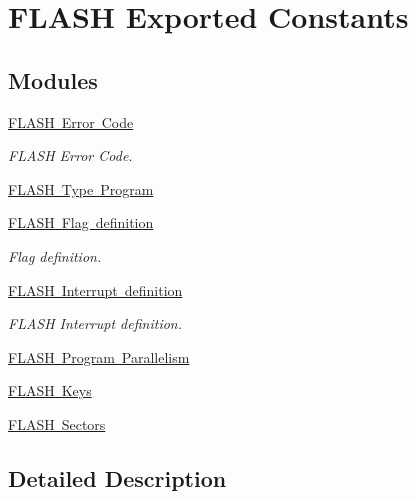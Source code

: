 \hypertarget{group___f_l_a_s_h___exported___constants}{}\section{F\+L\+A\+SH Exported Constants}
\label{group___f_l_a_s_h___exported___constants}
\subsection*{Modules}
\begin{DoxyCompactItemize}
\item 
\mbox{\hyperlink{group___f_l_a_s_h___error___code}{F\+L\+A\+S\+H Error Code}}
\begin{DoxyCompactList}\small\item\em F\+L\+A\+SH Error Code. \end{DoxyCompactList}\item 
\mbox{\hyperlink{group___f_l_a_s_h___type___program}{F\+L\+A\+S\+H Type Program}}
\item 
\mbox{\hyperlink{group___f_l_a_s_h___flag__definition}{F\+L\+A\+S\+H Flag definition}}
\begin{DoxyCompactList}\small\item\em Flag definition. \end{DoxyCompactList}\item 
\mbox{\hyperlink{group___f_l_a_s_h___interrupt__definition}{F\+L\+A\+S\+H Interrupt definition}}
\begin{DoxyCompactList}\small\item\em F\+L\+A\+SH Interrupt definition. \end{DoxyCompactList}\item 
\mbox{\hyperlink{group___f_l_a_s_h___program___parallelism}{F\+L\+A\+S\+H Program Parallelism}}
\item 
\mbox{\hyperlink{group___f_l_a_s_h___keys}{F\+L\+A\+S\+H Keys}}
\item 
\mbox{\hyperlink{group___f_l_a_s_h___sectors}{F\+L\+A\+S\+H Sectors}}
\end{DoxyCompactItemize}


\subsection{Detailed Description}
